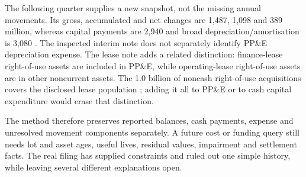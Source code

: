 The following quarter supplies a new snapshot, not the missing annual movements.
Its gross, accumulated and net changes are 1,487, 1,098 and 389 million,
whereas capital payments are 2,940 and broad depreciation/amortisation is
3,080 \citep[printed pp.~5 and 9]{apple2025q1}. The inspected interim note does
not separately identify PP\&E depreciation expense. The lease note adds a
related distinction: finance-lease right-of-use assets are included in PP\&E,
while operating-lease right-of-use assets are in other noncurrent assets.
The 1.0 billion of noncash right-of-use acquisitions covers the disclosed lease
population \citep[Note 8, printed p.~42]{apple2024}; adding it all to PP\&E
or to cash capital expenditure would erase that distinction.

The method therefore preserves reported balances, cash payments, expense and
unresolved movement components separately. A future cost or funding query
still needs lot and asset ages, useful lives, residual values, impairment and
settlement facts. The real filing has supplied constraints and ruled out one
simple history, while leaving several different explanations open.
